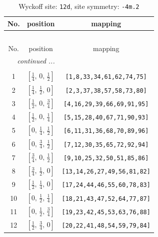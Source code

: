 \documentclass[fleqn,8pt]{jsarticle}
\begin{document}
\begin{longtable}{ccc}
\caption{Wyckoff site: {\tt 12d}, site symmetry: {\tt -4m.2}}
 \\
 \hline \hline
No. & position & mapping \\ \hline \endfirsthead

\multicolumn{2}{l}{\tablename\ \thetable{}} \\
 \hline \hline
No. & position & mapping \\ \hline \endhead

 \hline \hline
\multicolumn{2}{r}{\footnotesize\it continued ...} \\ \endfoot

 \hline \hline
\multicolumn{2}{r}{} \\ \endlastfoot

1 & $\left[ \frac{1}{4},\, 0,\, \frac{1}{2} \right]$ & {\tt [1,8,33,34,61,62,74,75]} \\ \hline
2 & $\left[ \frac{1}{4},\, \frac{1}{2},\, 0 \right]$ & {\tt [2,3,37,38,57,58,73,80]} \\ \hline
3 & $\left[ \frac{1}{2},\, 0,\, \frac{3}{4} \right]$ & {\tt [4,16,29,39,66,69,91,95]} \\ \hline
4 & $\left[ \frac{1}{2},\, 0,\, \frac{1}{4} \right]$ & {\tt [5,15,28,40,67,71,90,93]} \\ \hline
5 & $\left[ 0,\, \frac{1}{4},\, \frac{1}{2} \right]$ & {\tt [6,11,31,36,68,70,89,96]} \\ \hline
6 & $\left[ 0,\, \frac{3}{4},\, \frac{1}{2} \right]$ & {\tt [7,12,30,35,65,72,92,94]} \\ \hline
7 & $\left[ \frac{3}{4},\, 0,\, \frac{1}{2} \right]$ & {\tt [9,10,25,32,50,51,85,86]} \\ \hline
8 & $\left[ \frac{3}{4},\, \frac{1}{2},\, 0 \right]$ & {\tt [13,14,26,27,49,56,81,82]} \\ \hline
9 & $\left[ \frac{1}{2},\, \frac{1}{4},\, 0 \right]$ & {\tt [17,24,44,46,55,60,78,83]} \\ \hline
10 & $\left[ 0,\, \frac{1}{2},\, \frac{1}{4} \right]$ & {\tt [18,21,43,47,52,64,77,87]} \\ \hline
11 & $\left[ 0,\, \frac{1}{2},\, \frac{3}{4} \right]$ & {\tt [19,23,42,45,53,63,76,88]} \\ \hline
12 & $\left[ \frac{1}{2},\, \frac{3}{4},\, 0 \right]$ & {\tt [20,22,41,48,54,59,79,84]} \\
\end{longtable}
\renewcommand{\arraystretch}{1.2}
\end{document}
